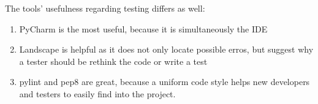 The tools' usefulness regarding testing differs as well:
\begin{enumerate}
    \item PyCharm is the most useful, because it is simultaneously the IDE
    \item Landscape is helpful as it does not only locate possible erros, but suggest why a tester should be rethink the code or write a test 
    \item pylint and pep8 are great, because a uniform code style helps new developers and testers to easily find into the project. 
\end{enumerate}
